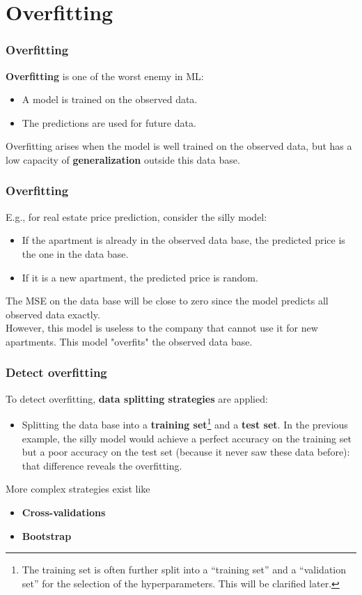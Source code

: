 \section{Overfitting}
\begin{frame}
\frametitle{Overfitting}
{\bf Overfitting} is one of the worst enemy in ML:
\begin{itemize}
\item A model is trained on the observed data. 
\item The predictions are used for future data.
\end{itemize}
Overfitting arises when the model is well trained on the observed data, but has a low capacity of {\bf generalization} outside this data base. 
\end{frame}
\begin{frame}
\frametitle{Overfitting}
E.g., for real estate price prediction, consider the silly model: 
\begin{itemize}
\item If the apartment is already in the observed data base, the predicted price is the one in the data base. 
\item If it is a new apartment, the predicted price is random. 
\end{itemize}
The MSE on the data base will be close to zero since the model predicts all observed data exactly. \\ 
\vspace{0.3cm}
However, this model is useless to the company that cannot use it for new apartments. This model "overfits" the observed data base. 
\end{frame}
\begin{frame}
\frametitle{Detect overfitting}
To detect overfitting, {\bf data splitting strategies} are applied: 
\begin{itemize}
\item Splitting the data base into a {\bf training set}\footnote{The training set is often further split into a ``training set'' and a ``validation set'' for the selection of the hyperparameters. This will be clarified later.} and a {\bf test set}. In the previous example, the silly model would achieve a perfect accuracy on the training set but a poor accuracy on the test set (because it never saw these data before): that difference reveals the overfitting. 
\end{itemize}
More complex strategies exist like
\begin{itemize}
\item {\bf Cross-validations}
\item {\bf Bootstrap}
\end{itemize}
\end{frame}
